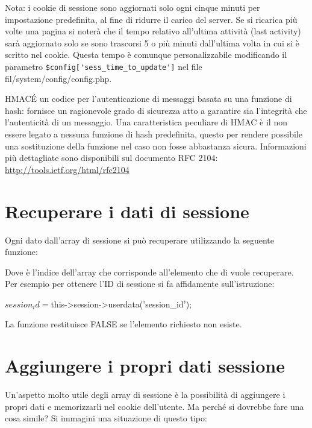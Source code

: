 Nota: i cookie di sessione sono aggiornati solo ogni cinque minuti per impostazione predefinita, al fine di ridurre il carico del server. Se si ricarica più volte una pagina si noterà che il tempo relativo all'ultima attività (last activity) sarà aggiornato solo se sono trascorsi 5 o più minuti dall'ultima volta in cui si è scritto nel cookie. Questa tempo è comunque personalizzabile modificando il parametro \verb|$config['sess_time_to_update']| nel file fil{/system/config/config.php}.

\begin{deftabv}{HMAC}{\'E un codice per l'autenticazione di messaggi basata su una funzione di hash: fornisce un ragionevole grado di sicurezza atto a garantire sia l'integrità che l'autenticità di un messaggio. Una caratteristica peculiare di HMAC è il non essere legato a nessuna funzione di hash predefinita, questo per rendere possibile una sostituzione della funzione nel caso non fosse abbastanza sicura. Informazioni più dettagliate sono disponibili sul documento RFC 2104: \url{http://tools.ietf.org/html/rfc2104}}
\end{deftabv}

\section*{Recuperare i dati di sessione}
Ogni dato dall'array di sessione si può recuperare utilizzando la seguente funzione:


Dove  è l'indice dell'array che corrisponde all'elemento che di vuole recuperare. Per esempio per ottenere l'ID di sessione si fa affidamente sull'istruzione:

\begin{code}
$session_id = $this->session->userdata('session_id');
\end{code}

La funzione restituisce FALSE se l'elemento richiesto non esiste.

\section*{Aggiungere i propri dati sessione}
Un'aspetto molto utile degli array di sessione è la possibilità di aggiungere i propri dati e memorizzarli nel cookie dell'utente. Ma perché si dovrebbe fare una cosa simile? Si immagini una situazione di questo tipo: 

